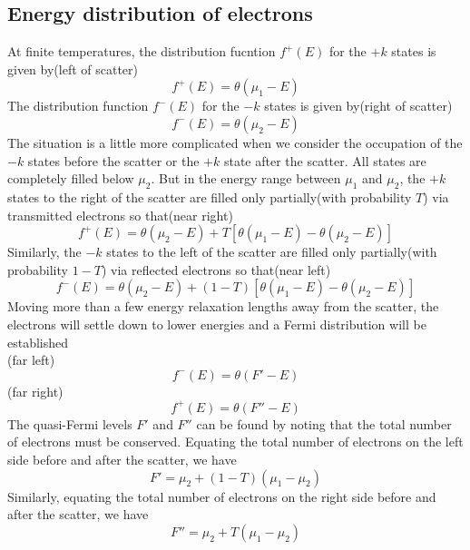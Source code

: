 \documentclass[11pt,a4paper]{book}
\theoremstyle{plain}
\theoremstyle{definition}
\theoremstyle{remark}
\begin{document}
\subsection{Energy distribution of electrons}
At finite temperatures, the distribution fucntion $f^+(E)$ for the $+k$ states is given by(left of scatter)
\begin{equation}
    f^+(E) = \theta(\mu_1 - E)
\end{equation}
The distribution function $f^-(E)$ for the $-k$ states is given by(right of scatter)
\begin{equation}
    f^-(E) = \theta(\mu_2 - E)
\end{equation}
The situation is a little more complicated when we consider the occupation of the $-k$ states before the scatter or the $+k$ state after the scatter. All states are completely filled below $\mu_2$. But in the energy range between $\mu_1$ and $\mu_2$, the $+k$ states to the right of the scatter are filled only partially(with probability $T$) via transmitted electrons so that(near right)
\begin{equation}
    f^+(E) = \theta(\mu_2 - E) + T\left[\theta(\mu_1 - E) - \theta(\mu_2 - E)\right]
\end{equation}
Similarly, the $-k$ states to the left of the scatter are filled only partially(with probability $1-T$) via reflected electrons so that(near left)
\begin{equation}
    f^-(E) = \theta(\mu_2 - E) + (1-T)\left[\theta(\mu_1 - E) - \theta(\mu_2 - E)\right]
\end{equation}
Moving more than a few energy relaxation lengths away from the scatter, the electrons will settle down to lower energies and a Fermi distribution will be established \\
(far left)
\begin{equation}
    f^-(E) = \theta(F' - E) 
\end{equation}
(far right)
\begin{equation}
    f^+(E) = \theta(F'' - E)
\end{equation}
The quasi-Fermi levels $F'$ and $F''$ can be found by noting that the total number of electrons must be conserved. Equating the total number of electrons on the left side before and after the scatter, we have
\begin{equation}
    F' = \mu_2 + (1-T)(\mu_1 - \mu_2)
\end{equation}
Similarly, equating the total number of electrons on the right side before and after the scatter, we have
\begin{equation}
    F'' = \mu_2 + T(\mu_1 - \mu_2)
\end{equation}
\end{document}
